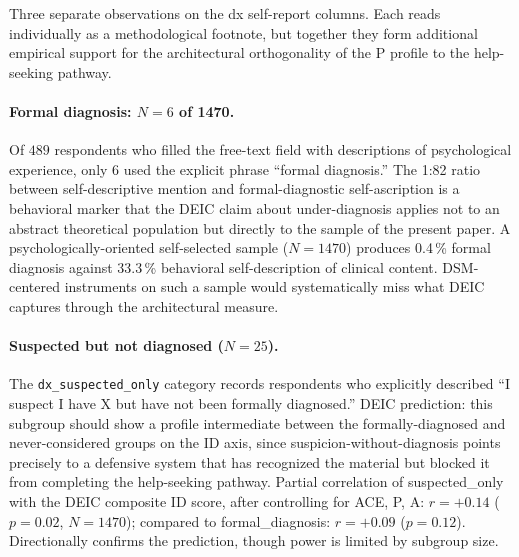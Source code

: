Three separate observations on the dx self-report columns. Each reads individually as a methodological footnote, but together they form additional empirical support for the architectural orthogonality of the P profile to the help-seeking pathway.

\paragraph{Formal diagnosis: $N = 6$ of 1470.} Of $489$ respondents who filled the free-text field with descriptions of psychological experience, only $6$ used the explicit phrase ``formal diagnosis.'' The 1:82 ratio between self-descriptive mention and formal-diagnostic self-ascription is a behavioral marker that the DEIC claim about under-diagnosis applies not to an abstract theoretical population but directly to the sample of the present paper. A psychologically-oriented self-selected sample ($N = 1470$) produces 0.4\,\% formal diagnosis against 33.3\,\% behavioral self-description of clinical content. DSM-centered instruments on such a sample would systematically miss what DEIC captures through the architectural measure.

\paragraph{Suspected but not diagnosed ($N = 25$).} The \texttt{dx\_suspected\_only} category records respondents who explicitly described ``I suspect I have X but have not been formally diagnosed.'' DEIC prediction: this subgroup should show a profile intermediate between the formally-diagnosed and never-considered groups on the ID axis, since suspicion-without-diagnosis points precisely to a defensive system that has recognized the material but blocked it from completing the help-seeking pathway. Partial correlation of suspected\_only with the DEIC composite ID score, after controlling for ACE, P, A: $r = +0.14$ ($p = 0.02$, $N = 1470$); compared to formal\_diagnosis: $r = +0.09$ ($p = 0.12$). Directionally confirms the prediction, though power is limited by subgroup size.

